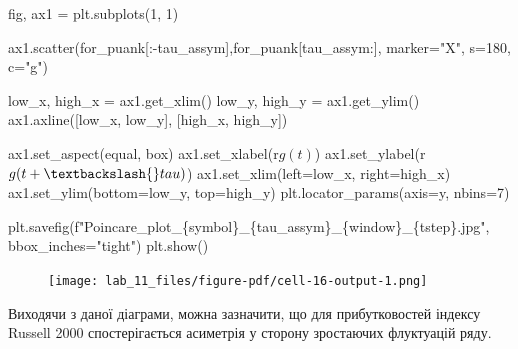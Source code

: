 \documentclass[
  letterpaper,
]{report}
\newenvironment{Shaded}{\begin{snugshade}}{\end{snugshade}}
\newcommand{\DecValTok}[1]{\textcolor[rgb]{0.68,0.00,0.00}{#1}}
\newcommand{\NormalTok}[1]{\textcolor[rgb]{0.00,0.23,0.31}{#1}}
\newcommand{\OperatorTok}[1]{\textcolor[rgb]{0.37,0.37,0.37}{#1}}
\newcommand{\SpecialCharTok}[1]{\textcolor[rgb]{0.37,0.37,0.37}{#1}}
\newcommand{\SpecialStringTok}[1]{\textcolor[rgb]{0.13,0.47,0.30}{#1}}
\newcommand{\StringTok}[1]{\textcolor[rgb]{0.13,0.47,0.30}{#1}}
\newcommand{\VerbatimStringTok}[1]{\textcolor[rgb]{0.13,0.47,0.30}{#1}}
\begin{document}
\begin{Shaded}
\begin{Highlighting}[]
\NormalTok{fig, ax1 }\OperatorTok{=}\NormalTok{ plt.subplots(}\DecValTok{1}\NormalTok{, }\DecValTok{1}\NormalTok{)}

\NormalTok{ax1.scatter(for\_puank[:}\OperatorTok{{-}}\NormalTok{tau\_assym],for\_puank[tau\_assym:], marker}\OperatorTok{=}\StringTok{"X"}\NormalTok{, s}\OperatorTok{=}\DecValTok{180}\NormalTok{, c}\OperatorTok{=}\StringTok{"g"}\NormalTok{)}

\NormalTok{low\_x, high\_x }\OperatorTok{=}\NormalTok{ ax1.get\_xlim()}
\NormalTok{low\_y, high\_y }\OperatorTok{=}\NormalTok{ ax1.get\_ylim()}
\NormalTok{ax1.axline([low\_x, low\_y], [high\_x, high\_y])}

\NormalTok{ax1.set\_aspect(}\StringTok{\textquotesingle{}equal\textquotesingle{}}\NormalTok{, }\StringTok{\textquotesingle{}box\textquotesingle{}}\NormalTok{)}
\NormalTok{ax1.set\_xlabel(}\VerbatimStringTok{r\textquotesingle{}$g(t)$\textquotesingle{}}\NormalTok{)}
\NormalTok{ax1.set\_ylabel(}\VerbatimStringTok{r\textquotesingle{}$g(t+\textbackslash{}tau)$\textquotesingle{}}\NormalTok{) }
\NormalTok{ax1.set\_xlim(left}\OperatorTok{=}\NormalTok{low\_x, right}\OperatorTok{=}\NormalTok{high\_x)}
\NormalTok{ax1.set\_ylim(bottom}\OperatorTok{=}\NormalTok{low\_y, top}\OperatorTok{=}\NormalTok{high\_y)}
\NormalTok{plt.locator\_params(axis}\OperatorTok{=}\StringTok{\textquotesingle{}y\textquotesingle{}}\NormalTok{, nbins}\OperatorTok{=}\DecValTok{7}\NormalTok{)}

\NormalTok{plt.savefig(}\SpecialStringTok{f"Poincare\_plot\_}\SpecialCharTok{\{}\NormalTok{symbol}\SpecialCharTok{\}}\SpecialStringTok{\_}\SpecialCharTok{\{}\NormalTok{tau\_assym}\SpecialCharTok{\}}\SpecialStringTok{\_}\SpecialCharTok{\{}\NormalTok{window}\SpecialCharTok{\}}\SpecialStringTok{\_}\SpecialCharTok{\{}\NormalTok{tstep}\SpecialCharTok{\}}\SpecialStringTok{.jpg"}\NormalTok{, bbox\_inches}\OperatorTok{=}\StringTok{"tight"}\NormalTok{)}
\NormalTok{plt.show()}
\end{Highlighting}
\end{Shaded}

\begin{figure}[H]

{\centering \texttt{[image: lab\_11\_files/figure-pdf/cell-16-output-1.png]}

}

\end{figure}

Виходячи з даної діаграми, можна зазначити, що для прибутковостей
індексу Russell 2000 спостерігається асиметрія у сторону зростаючих
флуктуацій ряду.
\end{document}

